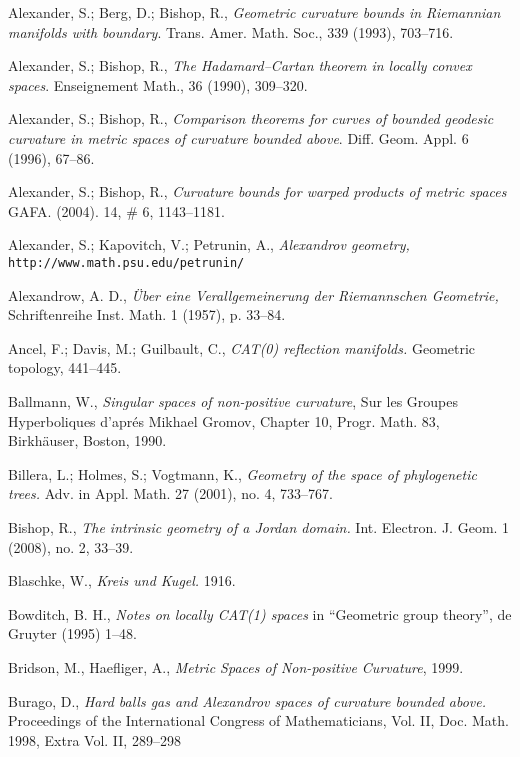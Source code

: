 \begin{thebibliography}{52}

Alexander, S.; Berg, D.; Bishop, R., 
\textit{Geometric curvature bounds in Riemannian manifolds with boundary}. 
Trans. Amer. Math. Soc., 339 (1993), 703--716.

Alexander, S.; 
Bishop, R., 
\textit{The Hadamard--Cartan theorem in locally convex spaces}. 
Enseignement Math., 
36 
(1990), 
309--320.

 Alexander, S.; Bishop, R., 
\textit{Comparison theorems for curves of bounded geodesic curvature in metric spaces of curvature bounded above}.
Diff. Geom. Appl. 
6 
(1996), 
67--86.

Alexander, S.; 
Bishop, R., 
\textit{Curvature bounds for warped products of metric spaces}
GAFA. 
(2004). 
14, 
\# 6, 
1143--1181.

Alexander, S.;
Kapovitch, V.;
Petrunin, A.,
\textit{Alexandrov geometry,}
 \texttt{http://www.math.psu.edu/petrunin/}

 Alexandrow, A. D.,  \textit{\"Uber eine Verallgemeinerung der Riemannschen Geometrie,}
Schriftenreihe Inst. Math. 
1 
(1957), 
p. 33--84.

 Ancel, F.; Davis, M.; Guilbault, C.,
\textit{CAT(0) reflection manifolds.} 
Geometric topology, 
441--445.

Ballmann, W., 
\textit{Singular spaces of non-positive curvature}, 
Sur les Groupes Hyperboliques d'apr\'{e}s Mikhael Gromov, Chapter 10, Progr. Math. 83, Birkh\"auser, Boston, 1990. 

Billera, L.; 
Holmes, S.; 
Vogtmann, K., 
\textit{Geometry of the space of phylogenetic trees.}
Adv. in Appl. Math. 
27 
(2001), 
no. 4, 
733--767.

Bishop, R., 
\textit{The intrinsic geometry of a Jordan domain.} 
Int. Electron. J. Geom. 
1 
(2008), 
no. 2, 
33--39.

Blaschke, W., 
\textit{Kreis und Kugel.} 1916.

Bowditch, B. H.,
\textit{Notes on locally CAT(1) spaces} 
in ``Geometric group theory'', 
de Gruyter (1995) 1--48.

Bridson, M., 
Haefliger, A.,
\textit{Metric Spaces of Non-positive Curvature}, 1999.

Burago, D., 
\textit{Hard balls gas and Alexandrov spaces of curvature bounded above.} 
Proceedings of the International Congress of Mathematicians, Vol. II, 
Doc. Math. 1998, 
Extra Vol. II, 
289--298


\end{thebibliography}
